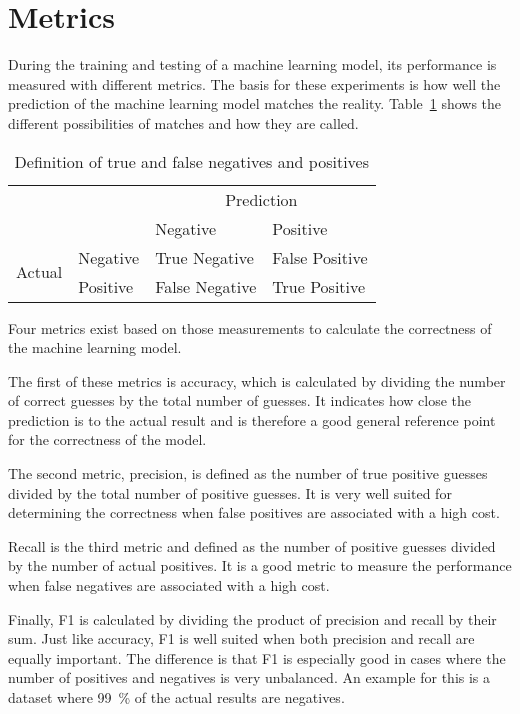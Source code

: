 \section{Metrics}\label{sec:metrics}
During the training and testing of a machine learning model, its performance is measured with different metrics. The basis for these experiments is how well the prediction of the machine learning model matches the reality. Table~\ref{table:true-false-neg-pos} shows the different possibilities of matches and how they are called. %

\begin{table}[ht]
  \centering
  \caption{Definition of true and false negatives and positives} %
  \begin{tabular}{ll|l|l} %
                            & \multicolumn{1}{c}{} & \multicolumn{2}{c}{Prediction}                  \\
                            &                      & Negative                       & Positive       \\ \cline{2-4}
    \multirow{2}{*}{Actual} & Negative             & True Negative                  & False Positive \\ \cline{2-4}
                            & Positive             & False Negative                 & True Positive  \\
  \end{tabular}\label{table:true-false-neg-pos}
\end{table}

Four metrics exist based on those measurements to calculate the correctness of the machine learning model.

The first of these metrics is accuracy, which is calculated by dividing the number of correct guesses by the total number of guesses. It indicates how close the prediction is to the actual result and is therefore a good general reference point for the correctness of the model.

The second metric, precision, is defined as the number of true positive guesses divided by the total number of positive guesses. It is very well suited for determining the correctness when false positives are associated with a high cost.

Recall is the third metric and defined as the number of positive guesses divided by the number of actual positives. It is a good metric to measure the performance when false negatives are associated with a high cost.

Finally, F1 is calculated by dividing the product of precision and recall by their sum. Just like accuracy, F1 is well suited when both precision and recall are equally important. The difference is that F1 is especially good in cases where the number of positives and negatives is very unbalanced. An example for this is a dataset where \SI{99}{\percent} of the actual results are negatives.
